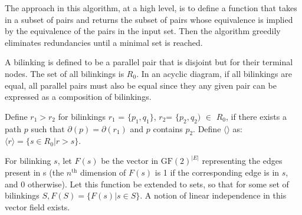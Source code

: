 \documentclass[sigplan,review,anonymous]{acmart}
\begin{document}
The approach in this algorithm, at a high level, is to define a function that takes in a subset of pairs and returns the subset of pairs whose equivalence is implied by the equivalence of the pairs in the input set.
Then the algorithm greedily eliminates redundancies until a minimal set is reached.

A bilinking is defined to be a parallel pair that is disjoint but for their terminal nodes. The set of all bilinkings is $R_0$.
In an acyclic diagram, if all bilinkings are equal, all parallel pairs must also be equal since they any given pair can be expressed as a composition of bilinkings.

Define $r_1>r_2$ for bilinkings $r_1$ = $\{p_1,q_1\}$, $r_2$= $\{p_2, q_2)$ $\in$ $R_0$, if there exists a path $p$ such that $\partial(p) = \partial(r_1)$ and $p$ contains $p_2$.
Define $\langle\rangle$ as:
$\langle r \rangle = \{ s\in R_0| r>s\}$.

For bilinking $s$, let $F(s)$ be the vector in $\text{GF}(2)^{|E|}$ representing the edges present in s (the $n^{\text{th}}$ dimension of $F(s)$ is 1 if the corresponding edge is in $s$, and 0 otherwise).
Let this function be extended to sets, so that for some set of bilinkings $S, F(S) = \{ F(s) | s\in S \}$. A notion of linear independence in this vector field exists.
\end{document}
